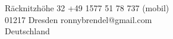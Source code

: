 \color{header-blue}

	\section*{\Huge \name}

	R\"acknitzh\"ohe 32 \hfill +49 1577 51 78 737 (mobil)\\
	01217 Dresden \hfill ronnybrendel@gmail.com\\
	Deutschland \hfill

\color{black}

\vspace{0.6cm}
